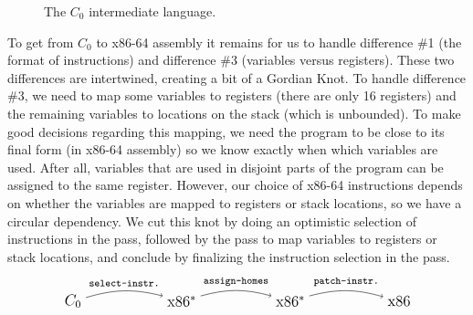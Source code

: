 \documentclass[11pt]{book}
\begin{document}
\begin{figure}[tbp]
\caption{The $C_0$ intermediate language.}
\label{fig:c0-syntax}
\end{figure}

To get from $C_0$ to x86-64 assembly it remains for us to handle
difference \#1 (the format of instructions) and difference \#3
(variables versus registers). These two differences are intertwined,
creating a bit of a Gordian Knot. To handle difference \#3, we need to
map some variables to registers (there are only 16 registers) and the
remaining variables to locations on the stack (which is unbounded). To
make good decisions regarding this mapping, we need the program to be
close to its final form (in x86-64 assembly) so we know exactly when
which variables are used. After all, variables that are used in
disjoint parts of the program can be assigned to the same register.
However, our choice of x86-64 instructions depends on whether the
variables are mapped to registers or stack locations, so we have a
circular dependency. We cut this knot by doing an optimistic selection
of instructions in the  pass, followed by the
 pass to map variables to registers or stack
locations, and conclude by finalizing the instruction selection in the
 pass.
\[
\begin{tikzpicture}[baseline=(current  bounding  box.center)]
\node (1) at (0,0)  {\large $C_0$};
\node (2) at (3,0)  {\large $\text{x86}^{*}$};
\node (3) at (6,0)  {\large $\text{x86}^{*}$};
\node (4) at (9,0) {\large $\text{x86}$};

\path[->,bend left=15] (1) edge [above] node {\ttfamily\footnotesize select-instr.} (2);
\path[->,bend left=15] (2) edge [above] node {\ttfamily\footnotesize assign-homes} (3);
\path[->,bend left=15] (3) edge [above] node {\ttfamily\footnotesize patch-instr.} (4);
\end{tikzpicture}
\]
\end{document}
